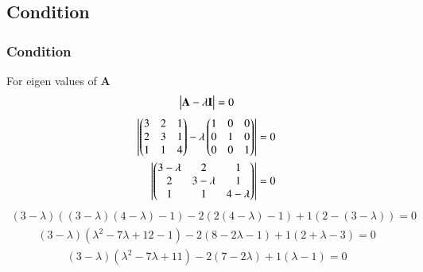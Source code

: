 \documentclass{beamer}
\providecommand{\brak}[1]{\ensuremath{\left(#1\right)}}
\theoremstyle{remark}
\newcommand{\myvec}[1]{\ensuremath{\begin{pmatrix}#1\end{pmatrix}}}
\let\vec\mathbf
\numberwithin{equation}{section}
\begin{document}
 \subsection{Condition}
\begin{frame}
\frametitle{Condition}
For eigen values of $\vec{A}$
\begin{align}
    \mydet{\vec{A}-\lambda\vec{I}}=0 
    \end{align}
    \begin{align}
    \mydet{\myvec{3&2&1\\2&3&1\\1&1&4}-\lambda\myvec{1&0&0\\0&1&0\\0&0&1}} = 0 \\
 \mydet{\myvec{3-\lambda&2&1\\2&3-\lambda&1\\1&1&4-\lambda}}=0 
 \end{align}
 \begin{align}
 \brak{3-\lambda}\brak{\brak{3-\lambda}\brak{4-\lambda}-1}-2\brak{2\brak{4-\lambda}-1}+1\brak{2-\brak{3-\lambda}}=0 
 \end{align}
 \vspace{-0.7cm} 
 \begin{align}
 \brak{3-\lambda}\brak{\lambda^2-7\lambda+12-1}-2\brak{8-2\lambda-1}+1\brak{2+\lambda-3}=0 
 \end{align}
 \vspace{-0.7cm} 
 \begin{align}
 \brak{3-\lambda}\brak{\lambda^2-7\lambda+11}-2\brak{7-2\lambda}+1\brak{\lambda-1}=0 
 \end{align}
 \end{frame}
\end{document}
